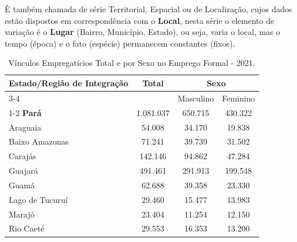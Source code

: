 È também chamada de série Territorial, Espacial ou de Localização, cujos dados estão dispostos em correspondência com o \textbf{Local}, nesta série o elemento de variação é o \textbf{Lugar} (Bairro, Município, Estado), ou seja, varia o local, mas o tempo (época) e o fato (espécie) permanecem constantes (fixos).


\begin{table}[H]
\centering
    {
    \caption{Vínculos Empregatícios Total e por Sexo no Emprego Formal - 2021.}
    \label{obitos2}
    \vspace{0.1cm}
\begin{tabular}{l|c|c|c}
\hline\hline
\multirow{2}{*}{Estado/Região de Integração} & \multicolumn{1}{c|}{\multirow{2}{*}{Total}} & \multicolumn{2}{c}{Sexo}                   \\ \cline{3-4} 
                           & \multicolumn{1}{c|}{}                       & \multicolumn{1}{c|}{Masculino} & \multicolumn{1}{c}{Feminino} \\ \cline{1-2}
\hline 
\textbf{Pará}              &  1.081.037                                 &  650.715                      &   430.322                    \\
\hline \hline
Araguaia                   &  54.008                                    &  34.170                       &   19.838                     \\
Baixo Amazonas             &  71.241                                    &  39.739                       &   31.502                     \\
Carajás                    &  142.146                                   &  94.862                       &   47.284                     \\
Guajará                    &  491.461                                   &  291.913                      &   199.548                     \\
Guamá                      &  62.688                                    &  39.358                       &   23.330                      \\
Lago de Tucuruí            &  29.460                                    &  15.477                       &   13.983                       \\
Marajó                     &  23.404                                    &  11.254                       &   12.150                           \\
Rio Caeté                  &  29.553                                    &  16.353                       &   13.200                           \\

\end{tabular}}
\end{table}
